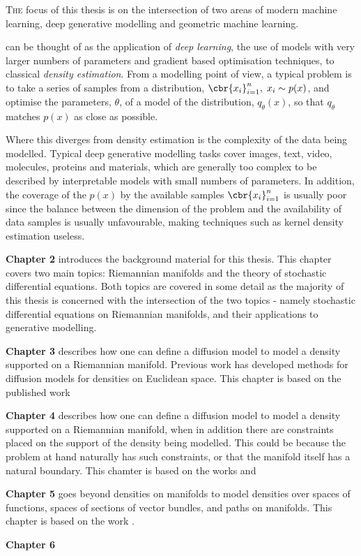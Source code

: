 \lettrine{T}{he} focus of this thesis is on the intersection of two areas of modern machine learning, deep generative modelling and geometric machine learning.

 can be thought of as the application of \emph{deep learning}, the use of models with very larger numbers of parameters and gradient based optimisation techniques, to classical \emph{density estimation}.
From a modelling point of view, a typical problem is to take a series of samples from a distribution, \(\cbr{x_i}_{i=1}^n, \; x_i \sim p(x)\), and optimise the parameters, \(\theta\), of a model of the distribution, \(q_\theta(x)\), so that \(q_\theta\) matches \(p(x)\) as close as possible.

Where this diverges from density estimation is the complexity of the data being modelled.
Typical deep generative modelling tasks cover images, text, video, molecules, proteins and materials, which are generally too complex to be described by interpretable models with small numbers of parameters.
In addition, the coverage of the \(p(x)\) by the available samples \(\cbr{x_i}_{i=1}^n\) is usually poor since the balance between the dimension of the problem and the availability of data samples is usually unfavourable, making techniques such as kernel density estimation useless.


\textbf{Chapter 2} introduces the background material for this thesis. This chapter covers two main topics: Riemannian manifolds and the theory of stochastic differential equations. Both topics are covered in some detail as the majority of this thesis is concerned with the intersection of the two topics - namely stochastic differential equations on Riemannian manifolds, and their applications to generative modelling.

\textbf{Chapter 3} describes how one can define a diffusion model to model a density supported on a Riemannian manifold. Previous work has developed methods for diffusion models for densities on Euclidean space. This chapter is based on the published work 

\textbf{Chapter 4} describes how one can define a diffusion model to model a density supported on a Riemannian manifold, when in addition there are constraints placed on the support of the density being modelled. This could be because the problem at hand naturally has such constraints, or that the manifold itself has a natural boundary. This chamter is based on the works  and 

\textbf{Chapter 5} goes beyond densities on manifolds to model densities over spaces of functions, spaces of sections of vector bundles, and paths on manifolds. This chapter is based on the work .

\textbf{Chapter 6} 
